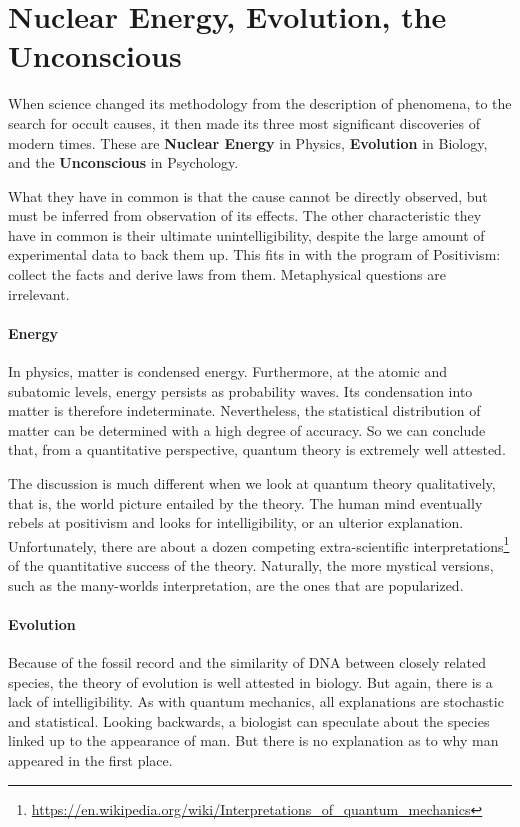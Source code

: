 \section{Nuclear Energy, Evolution, the Unconscious}

When science changed its methodology from the description of phenomena, to the search for occult causes, it then made its three most significant discoveries of modern times. These are \textbf{Nuclear Energy} in Physics, \textbf{Evolution} in Biology, and the \textbf{Unconscious} in Psychology.

What they have in common is that the cause cannot be directly observed, but must be inferred from observation of its effects. The other characteristic they have in common is their ultimate unintelligibility, despite the large amount of experimental data to back them up. This fits in with the program of Positivism: collect the facts and derive laws from them. Metaphysical questions are irrelevant.



\paragraph{Energy}


In physics, matter is condensed energy. Furthermore, at the atomic and subatomic levels, energy persists as probability waves. Its condensation into matter is therefore indeterminate. Nevertheless, the statistical distribution of matter can be determined with a high degree of accuracy. So we can conclude that, from a quantitative perspective, quantum theory is extremely well attested.

The discussion is much different when we look at quantum theory qualitatively, that is, the world picture entailed by the theory. The human mind eventually rebels at positivism and looks for intelligibility, or an ulterior explanation. Unfortunately, there are about a dozen competing extra-scientific interpretations\footnote{\url{https://en.wikipedia.org/wiki/Interpretations_of_quantum_mechanics}} of the quantitative success of the theory. Naturally, the more mystical versions, such as the many-worlds interpretation, are the ones that are popularized.


\paragraph{Evolution}


Because of the fossil record and the similarity of DNA between closely related species, the theory of evolution is well attested in biology. But again, there is a lack of intelligibility. As with quantum mechanics, all explanations are stochastic and statistical. Looking backwards, a biologist can speculate about the species linked up to the appearance of man. But there is no explanation as to why man appeared in the first place.


